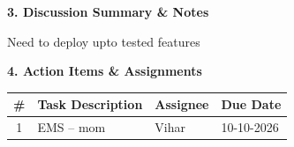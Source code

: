 \documentclass[11pt,a4paper]{article}
\begin{document}
\vspace{0.4cm}

{\large \bfseries \color{titleblue} 3. Discussion Summary \& Notes}

\vspace{0.15cm}

Need to deploy upto tested features

\vspace{0.4cm}

{\large \bfseries \color{titleblue} 4. Action Items \& Assignments}

\vspace{0.2cm}

\setlength{\arrayrulewidth}{0.5pt}\begin{tabularx}{\linewidth}{@{} c X l l @{}}\rowcolor{tableheader}\textbf{\#} & \textbf{Task Description} & \textbf{Assignee} & \textbf{Due Date} \\ \hline 1 & EMS -- mom & Vihar & 10-10-2026 \\ \end{tabularx}
\end{document}
